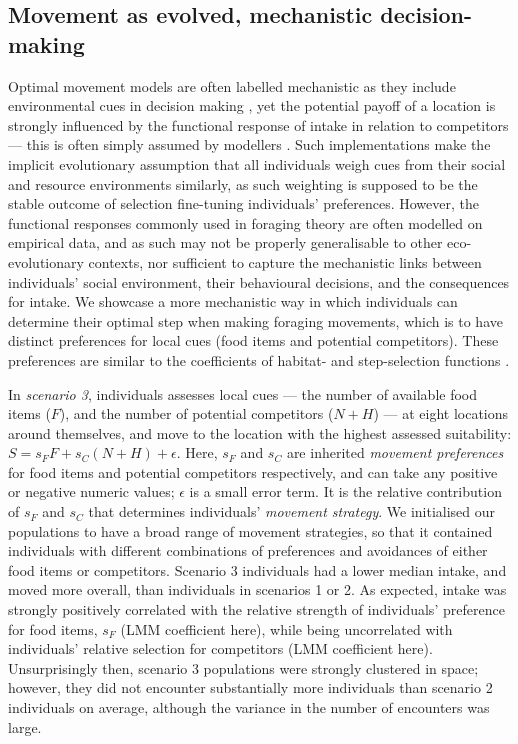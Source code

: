 \subsection{Movement as evolved, mechanistic decision-making}

Optimal movement models are often labelled mechanistic as they include environmental cues in decision making \citep[e.g.][]{scherer2020}, yet the potential payoff of a location is strongly influenced by the functional response of intake in relation to competitors --- this is often simply assumed by modellers \citep[][]{vandermeer1997}.
Such implementations make the implicit evolutionary assumption that all individuals weigh cues from their social and resource environments similarly, as such weighting is supposed to be the stable outcome of selection fine-tuning individuals' preferences.
However, the functional responses commonly used in foraging theory are often modelled on empirical data, and as such may not be properly generalisable to other eco-evolutionary contexts, nor sufficient to capture the mechanistic links between individuals' social environment, their behavioural decisions, and the consequences for intake.
We showcase a more mechanistic way in which individuals can determine their optimal step when making foraging movements, which is to have distinct preferences for local cues (food items and potential competitors).
These preferences are similar to the coefficients of habitat- and step-selection functions \citep[][; see more below]{fortin2005,avgar2013,avgar2016,fieberg2010}.

In \textit{scenario 3}, individuals assesses local cues --- the number of available food items ($F$), and the number of potential competitors ($N + H$) --- at eight locations around themselves, and move to the location with the highest assessed suitability: $S = s_FF + s_C(N + H) + \epsilon$.
Here, $s_F$ and $s_C$ are inherited \textit{movement preferences} for food items and potential competitors respectively, and can take any positive or negative numeric values; $\epsilon$ is a small error term.
It is the relative contribution of $s_F$ and $s_C$ that determines individuals' \textit{movement strategy}.
We initialised our populations to have a broad range of movement strategies, so that it contained individuals with different combinations of preferences and avoidances of either food items or competitors.
Scenario 3 individuals had a lower median intake, and moved more overall, than individuals in scenarios 1 or 2.
As expected, intake was strongly positively correlated with the relative strength of individuals' preference for food items, $s_F$ (LMM coefficient here), while being uncorrelated with individuals' relative selection for competitors (LMM coefficient here).
Unsurprisingly then, scenario 3 populations were strongly clustered in space; however, they did not encounter substantially more individuals than scenario 2 individuals on average, although the variance in the number of encounters was large.

